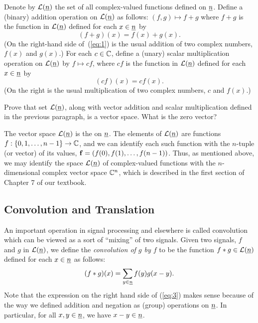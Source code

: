 Denote by $\mathcal L(\underline{n})$ the set of all complex-valued functions defined on $\underline{n}$.
Define a (binary) addition operation on $\mathcal L(\underline{n})$ as follows: 
$(f,g) \mapsto f+g$ where $f+g$ is the function in $\mathcal L(\underline{n})$ 
defined for each $x\in \underline{n}$ by
\begin{equation}
  \label{eq:1}
(f+g)(x) = f(x) + g(x).
\end{equation}
(On the right-hand side of~(\ref{eq:1}) is the usual addition of 
two complex numbers, $f(x)$ and $g(x)$.) 
For each $c\in \mathbb C$, define a (unary) scalar multiplication operation on 
$\mathcal L(\underline{n})$ by $f \mapsto cf$, where $cf$ is the function in $\mathcal L(\underline{n})$ 
defined for each $x\in \underline{n}$ by
\begin{equation}
  \label{eq:2}
(cf)(x) = c f(x).
\end{equation}
(On the right is the usual multiplication of two complex numbers, $c$ and $f(x)$.)
\begin{exercise}
  Prove that set $\mathcal L(\underline{n})$, along with vector addition and scalar multiplication
  defined in the previous paragraph, is a vector space.  What is
  the zero vector?
\end{exercise}
The vector space $\mathcal L(\underline{n})$ is the  
on $\underline{n}$. The elements of $\mathcal L(\underline{n})$ are 
functions $f: \{0,1,\dots, n-1\} \to \mathbb C$, and we can identify each such function
with the $n$-tuple (or vector) of its values, 
$\mathbf{f} = (f(0), f(1), \dots, f(n-1))$.  
Thus, as mentioned above, we may identify the space 
$\mathcal L(\underline{n})$ of complex-valued functions with the $n$-dimensional complex 
vector space $\mathbb C^n$, which is described in the first section of Chapter 7 
of our textbook.

\subsection{Convolution and Translation}
An important operation in signal processing and elsewhere is called convolution
which can be viewed as a sort of ``mixing'' of two signals. 
Given two signals, $f$ and $g$ in
$\mathcal L(\underline{n})$, we define the \emph{convolution of $g$ by $f$} to be the function
$f\ast g \in \mathcal L(\underline{n})$ defined for each $x\in \underline{n}$ as follows:
\begin{equation}
  \label{eq:3}
(f\ast g)(x) = \sum_{y\in \underline{n}} f(y) g(x-y).
\end{equation}
Note that the expression on the right hand side of (\ref{eq:3}) makes sense
because of the way we defined addition and negation as (group) operations 
on $\underline{n}$.  In particular, for all $x, y \in \underline{n}$, we have 
$x-y\in \underline{n}$.

